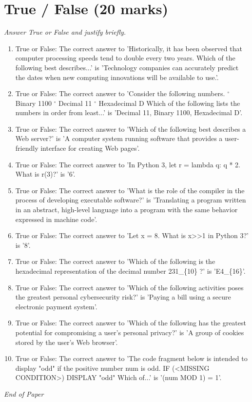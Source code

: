 \documentclass[12pt]{article}
\begin{document}
\section*{True / False (20 marks)}
\textit{Answer True or False and justify briefly.}
\begin{enumerate}[label=\arabic*.]
\item True or False: The correct answer to 'Historically, it has been observed that computer processing speeds tend to double every two years. Which of the following best describes...' is 'Technology companies can accurately predict the dates when new computing innovations will be available to use.'.
\item True or False: The correct answer to 'Consider the following numbers. $^\circ$ Binary 1100 $^\circ$ Decimal 11 $^\circ$ Hexadecimal D Which of the following lists the numbers in order from least...' is 'Decimal 11, Binary 1100, Hexadecimal D'.
\item True or False: The correct answer to 'Which of the following best describes a Web server?' is 'A computer system running software that provides a user-friendly interface for creating Web pages'.
\item True or False: The correct answer to 'In Python 3, let r = lambda q: q * 2. What is r(3)?' is '6'.
\item True or False: The correct answer to 'What is the role of the compiler in the process of developing executable software?' is 'Translating a program written in an abstract, high-level language into a program with the same behavior expressed in machine code'.
\item True or False: The correct answer to 'Let x = 8. What is x>>1 in Python 3?' is '8'.
\item True or False: The correct answer to 'Which of the following is the hexadecimal representation of the decimal number 231\_\{10\} ?' is 'E4\_\{16\}'.
\item True or False: The correct answer to 'Which of the following activities poses the greatest personal cybersecurity risk?' is 'Paying a bill using a secure electronic payment system'.
\item True or False: The correct answer to 'Which of the following has the greatest potential for compromising a user's personal privacy?' is 'A group of cookies stored by the user's Web browser'.
\item True or False: The correct answer to 'The code fragment below is intended to display "odd" if the positive number num is odd. IF (<MISSING CONDITION>) DISPLAY "odd" Which of...' is '(num MOD 1) = 1'.
\end{enumerate}

\vfill
\noindent\textit{End of Paper}
\end{document}
